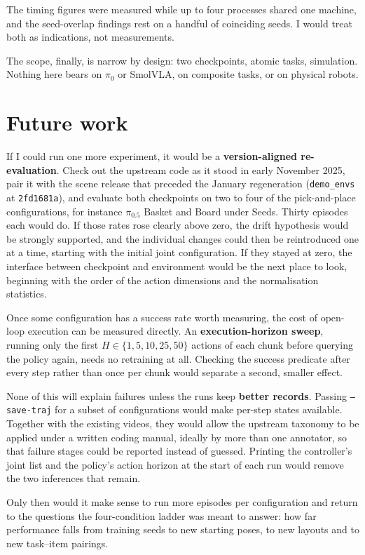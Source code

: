 The timing figures were measured while up to four processes shared one machine, and the seed-overlap findings rest on a handful of coinciding seeds. I would treat both as indications, not measurements.

The scope, finally, is narrow by design: two checkpoints, atomic tasks, simulation. Nothing here bears on $\pi_0$ or SmolVLA, on composite tasks, or on physical robots.

\section{Future work}
\label{sec:future}

If I could run one more experiment, it would be a \textbf{version-aligned re-evaluation}. Check out the upstream code as it stood in early November 2025, pair it with the scene release that preceded the January regeneration (\texttt{demo\_envs} at \texttt{2fd1681a}), and evaluate both checkpoints on two to four of the pick-and-place configurations, for instance $\pi_{0.5}$ Basket and Board under Seeds. Thirty episodes each would do. If those rates rose clearly above zero, the drift hypothesis would be strongly supported, and the individual changes could then be reintroduced one at a time, starting with the initial joint configuration. If they stayed at zero, the interface between checkpoint and environment would be the next place to look, beginning with the order of the action dimensions and the normalisation statistics.

Once some configuration has a success rate worth measuring, the cost of open-loop execution can be measured directly. An \textbf{execution-horizon sweep}, running only the first $H \in \{1, 5, 10, 25, 50\}$ actions of each chunk before querying the policy again, needs no retraining at all. Checking the success predicate after every step rather than once per chunk would separate a second, smaller effect.

None of this will explain failures unless the runs keep \textbf{better records}. Passing \texttt{--save-traj} for a subset of configurations would make per-step states available. Together with the existing videos, they would allow the upstream taxonomy to be applied under a written coding manual, ideally by more than one annotator, so that failure stages could be reported instead of guessed. Printing the controller's joint list and the policy's action horizon at the start of each run would remove the two inferences that remain.

Only then would it make sense to run more episodes per configuration and return to the questions the four-condition ladder was meant to answer: how far performance falls from training seeds to new starting poses, to new layouts and to new task--item pairings.

